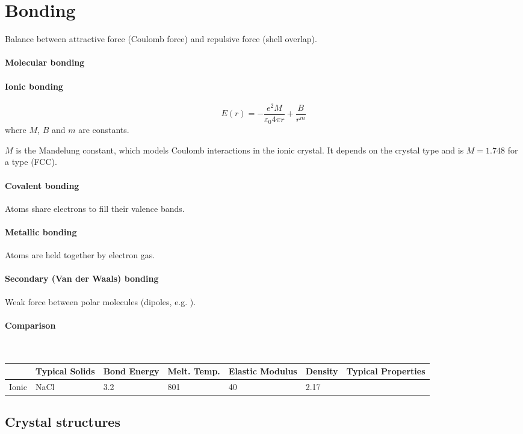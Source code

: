 \section{Bonding}
Balance between attractive force (Coulomb force) and repulsive force (shell overlap).

\paragraph{Molecular bonding}

\paragraph{Ionic bonding}

\begin{equation}
	E(r) = -\frac{e^2 M}{\varepsilon_0 4 \pi r} + \frac{B}{r^m}
\end{equation}
where $M$, $B$ and $m$ are constants. 

$M$ is the Mandelung constant, which models Coulomb interactions in the ionic crystal.
It depends on the crystal type and is $M=1.748$ for a  type (FCC).

\paragraph{Covalent bonding} 
Atoms share electrons to fill their valence bands.

\paragraph{Metallic bonding}
Atoms are held together by electron gas.

\paragraph{Secondary (Van der Waals) bonding}
Weak force between polar molecules (dipoles, e.g. ). 

\paragraph{Comparison} ~\\
\begin{tabularx}{\linewidth}{llllllX}
	& Typical Solids & Bond Energy  & Melt. Temp. & Elastic Modulus & Density & Typical Properties \\ \toprule
	Ionic & NaCl & 3.2 & 801 & 40 & 2.17 & \\
	
	\bottomrule
\end{tabularx}

\subsection{Crystal structures}